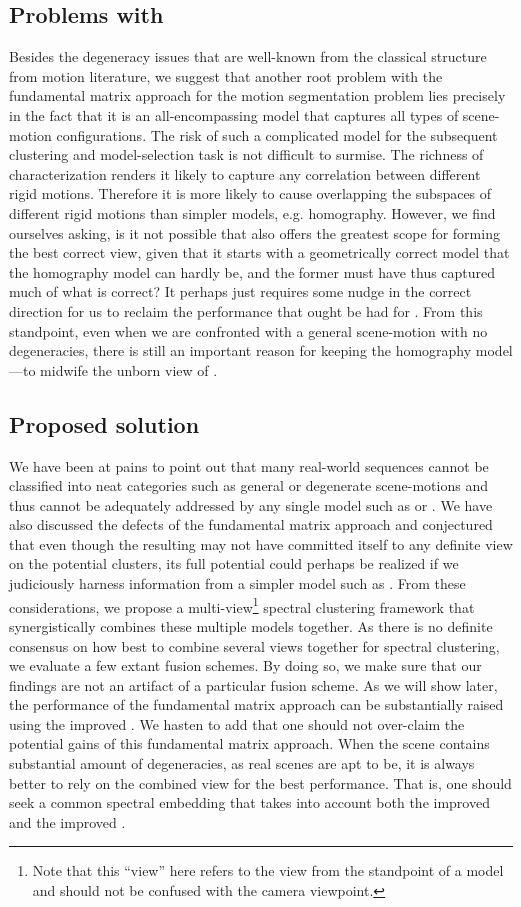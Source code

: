 \documentclass[10pt,twocolumn,letterpaper]{article}
\begin{document}
\subsection{Problems with }

Besides the degeneracy issues that are well-known from the classical structure from motion literature, we suggest that another root problem with the fundamental matrix approach for the motion segmentation problem lies precisely in the fact that it is an all-encompassing model that captures all types of scene-motion configurations. The risk of such a complicated model for the subsequent clustering and model-selection task is not difficult to surmise. The richness of characterization renders it likely to capture any correlation between different rigid motions. Therefore it is more likely to cause overlapping the subspaces of different rigid motions than simpler models, e.g. homography. However, we find ourselves asking, is it not possible that  also offers the greatest scope for forming the best correct view, given that it starts with a geometrically correct model that the homography model can hardly be, and the former must have thus captured much of what is correct? It perhaps just requires some nudge in the correct direction for us to reclaim the performance that ought be had for . From this standpoint, even when we are confronted with a general scene-motion with no degeneracies, there is still an important reason for keeping the homography model---to midwife the unborn view of .

\subsection{Proposed solution}
We have been at pains to point out that many real-world sequences cannot be classified into neat categories such as general or degenerate scene-motions and thus cannot be adequately addressed by any single model such as  or . We have also discussed the defects of the fundamental matrix approach and conjectured that even though the resulting  may not have committed itself to any definite view on the potential clusters, its full potential could perhaps be realized if we judiciously harness information from a simpler model such as . From these considerations, we propose a multi-view\footnote{Note that this ``view'' here refers to the view from the standpoint of a model and should not be confused with the camera viewpoint.} spectral clustering framework that synergistically combines these multiple models together. As there is no definite consensus on how best to combine several views together for spectral clustering, we evaluate a few extant fusion schemes. By doing so, we make sure that our findings are not an artifact of a particular fusion scheme. As we will show later, the performance of the fundamental matrix approach can be substantially raised using the improved . 
We hasten to add that one should not over-claim the potential gains of this fundamental matrix approach. When the scene contains substantial amount of degeneracies, as real scenes are apt to be, it is always better to rely on the combined view for the best performance. That is, one should seek a common spectral embedding that takes into account both the improved  and the improved .
\end{document}
